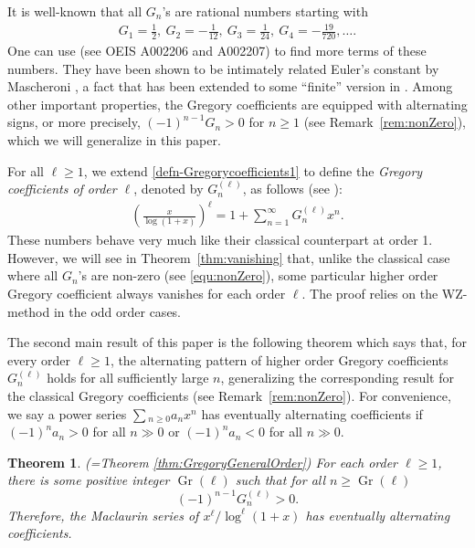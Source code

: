 \documentclass[11pt]{article}
\DeclareMathOperator{\Gr}{Gr}
\theoremstyle{plain}
\newtheorem{thm}{Theorem}[section]
\theoremstyle{definition}
\begin{document}
It is well-known that all $G_n$'s are rational numbers starting with
\begin{align*}
G_1=\frac1{2},\ G_2=-\frac1{12},\ G_3=\frac1{24},\ G_4=-\frac{19}{720}, \ldots.
\end{align*}
One can use \cite{Sloane2025} (see OEIS A002206 and A002207) to find more terms of these numbers.
They have been shown to be intimately related Euler's constant by Mascheroni \cite[pp. 21-23]{Mascheroni}, a fact that has been extended to some ``finite'' version in \cite{KanekoMatsusakaSeki2025}. Among other important properties, the Gregory coefficients are equipped with alternating signs, or more precisely, $(-1)^{n-1}G_n>0$ for $n\geq 1$ (see Remark~\ref{rem:nonZero}), which we will generalize in this paper.

For all $\ell\ge 1$, we extend \eqref{defn-Gregorycoefficients1} to define the \emph{Gregory coefficients of order $\ell$}, denoted by $G_n^{(\ell)}$,  as follows (see \cite{XuZhao2026}):
\begin{align}\label{defn-Gregorycoefficientsp}
\left(\frac{x}{\log(1+x)}\right)^\ell =1+\sum_{n=1}^\infty G_n^{(\ell)}x^n.
\end{align}
These numbers behave very much like their classical counterpart at order 1. However,
we will see in Theorem~\ref{thm:vanishing} that, unlike the classical case where all $G_n$'s are non-zero (see \eqref{equ:nonZero}), some particular higher order Gregory coefficient always vanishes for each order $\ell$. The proof relies on the WZ-method in the odd order cases.

The second main result of this paper is the following theorem which says that, for every order $\ell\ge 1$, the alternating pattern of higher order Gregory coefficients $G_n^{(\ell)}$ holds for all sufficiently large $n$, generalizing the corresponding result for the classical Gregory coefficients (see Remark~\ref{rem:nonZero}). For convenience, we say a power series $\sum{}_{n\ge 0} a_n x^n$ has eventually alternating coefficients if $(-1)^n a_n>0$ for all $n\gg 0$ or $(-1)^n a_n<0$ for all $n\gg 0$.


\begin{thm}\label{thm:GregoryGeneralOrderA} \emph{(=Theorem \ref{thm:GregoryGeneralOrder})}
For each order $\ell\ge 1$, there is some positive integer $\Gr(\ell)$ such that for all $n\ge \Gr(\ell)$
\begin{equation*}
(-1)^{n-1} G_n^{(\ell)}>0.
\end{equation*}
Therefore, the Maclaurin series of $x^\ell/\log^\ell(1+x)$ has eventually alternating coefficients.
\end{thm}
\end{document}
